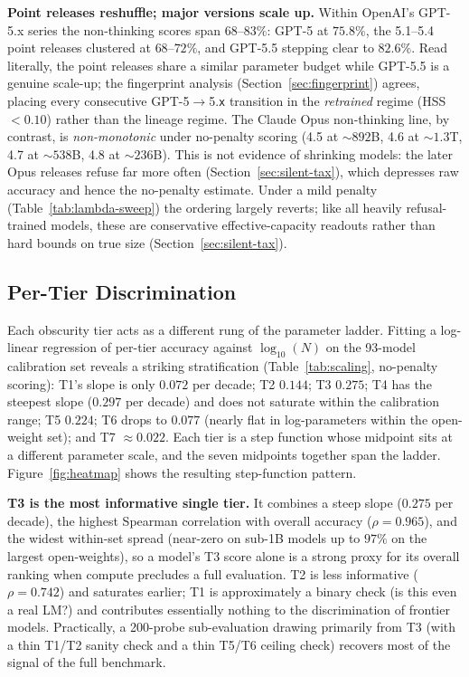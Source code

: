 \documentclass[11pt]{article}
\begin{document}
\textbf{Point releases reshuffle; major versions scale up.} Within OpenAI's GPT-5.x series the non-thinking scores span $68$--$83\%$: GPT-5 at $75.8\%$, the 5.1--5.4 point releases clustered at $68$--$72\%$, and GPT-5.5 stepping clear to $82.6\%$. Read literally, the point releases share a similar parameter budget while GPT-5.5 is a genuine scale-up; the fingerprint analysis (Section~\ref{sec:fingerprint}) agrees, placing every consecutive GPT-5$\to$5.\texttt{x} transition in the \emph{retrained} regime (HSS $<0.10$) rather than the lineage regime. The Claude Opus non-thinking line, by contrast, is \emph{non-monotonic} under no-penalty scoring (4.5 at ${\sim}892$B, 4.6 at ${\sim}1.3$T, 4.7 at ${\sim}538$B, 4.8 at ${\sim}236$B). This is not evidence of shrinking models: the later Opus releases refuse far more often (Section~\ref{sec:silent-tax}), which depresses raw accuracy and hence the no-penalty estimate. Under a mild penalty (Table~\ref{tab:lambda-sweep}) the ordering largely reverts; like all heavily refusal-trained models, these are conservative effective-capacity readouts rather than hard bounds on true size (Section~\ref{sec:silent-tax}).

\subsection{Per-Tier Discrimination}

Each obscurity tier acts as a different rung of the parameter ladder. Fitting a log-linear regression of per-tier accuracy against $\log_{10}(N)$ on the 93-model calibration set reveals a striking stratification (Table~\ref{tab:scaling}, no-penalty scoring): T1's slope is only $0.072$ per decade; T2 $0.144$; T3 $0.275$; T4 has the steepest slope ($0.297$ per decade) and does not saturate within the calibration range; T5 $0.224$; T6 drops to $0.077$ (nearly flat in log-parameters within the open-weight set); and T7 $\approx 0.022$. Each tier is a step function whose midpoint sits at a different parameter scale, and the seven midpoints together span the ladder. Figure~\ref{fig:heatmap} shows the resulting step-function pattern.

\textbf{T3 is the most informative single tier.} It combines a steep slope ($0.275$ per decade), the highest Spearman correlation with overall accuracy ($\rho = 0.965$), and the widest within-set spread (near-zero on sub-1B models up to $97\%$ on the largest open-weights), so a model's T3 score alone is a strong proxy for its overall ranking when compute precludes a full evaluation. T2 is less informative ($\rho = 0.742$) and saturates earlier; T1 is approximately a binary check (is this even a real LM?) and contributes essentially nothing to the discrimination of frontier models. Practically, a 200-probe sub-evaluation drawing primarily from T3 (with a thin T1/T2 sanity check and a thin T5/T6 ceiling check) recovers most of the signal of the full benchmark.
\end{document}
